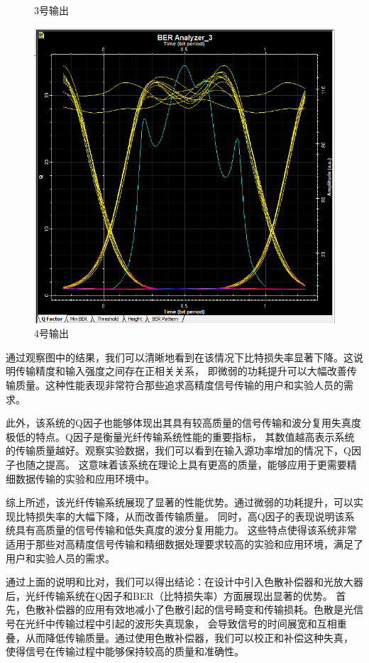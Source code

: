 \documentclass[12pt, a4paper, oneside]{article}
\begin{document}
\begin{spacing}{2.0}
\begin{figure}[H]
\begin{minipage}[t]{0.5\linewidth}
        \caption{3号输出}
        \label{fig:side:a}
      \end{minipage}%
      \begin{minipage}[t]{0.5\linewidth}
        \centering
        \includegraphics[scale=0.5]{sweep2Q4.png}
        \caption{4号输出}
        \label{fig:side:b}
      \end{minipage}
\end{figure}
通过观察图中的结果，我们可以清晰地看到在该情况下比特损失率显著下降。这说明传输精度和输入强度之间存在正相关关系，
即微弱的功耗提升可以大幅改善传输质量。这种性能表现非常符合那些追求高精度信号传输的用户和实验人员的需求。

此外，该系统的Q因子也能够体现出其具有较高质量的信号传输和波分复用失真度极低的特点。Q因子是衡量光纤传输系统性能的重要指标，
其数值越高表示系统的传输质量越好。观察实验数据，我们可以看到在输入源功率增加的情况下，Q因子也随之提高。
这意味着该系统在理论上具有更高的质量，能够应用于更需要精细数据传输的实验和应用环境中。

综上所述，该光纤传输系统展现了显著的性能优势。通过微弱的功耗提升，可以实现比特损失率的大幅下降，从而改善传输质量。
同时，高Q因子的表现说明该系统具有高质量的信号传输和低失真度的波分复用能力。
这些特点使得该系统非常适用于那些对高精度信号传输和精细数据处理要求较高的实验和应用环境，满足了用户和实验人员的需求。

通过上面的说明和比对，我们可以得出结论：在设计中引入色散补偿器和光放大器后，光纤传输系统在Q因子和BER（比特损失率）方面展现出显著的优势。
首先，色散补偿器的应用有效地减小了色散引起的信号畸变和传输损耗。色散是光信号在光纤中传输过程中引起的波形失真现象，
会导致信号的时间展宽和互相重叠，从而降低传输质量。通过使用色散补偿器，我们可以校正和补偿这种失真，
使得信号在传输过程中能够保持较高的质量和准确性。


\end{spacing}
\end{document}
